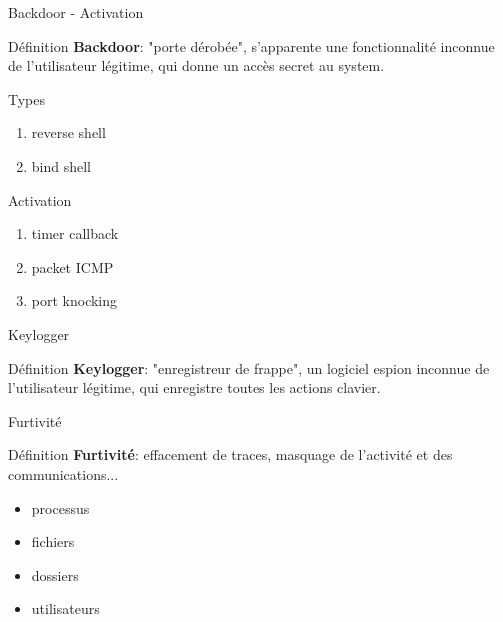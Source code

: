 \documentclass[10pt]{beamer}
\begin{document}
\begin{frame}{Backdoor - Activation}
	
	\begin{alertblock}{Définition}
		\textbf{Backdoor}: "porte dérobée", s'apparente une fonctionnalité inconnue de l'utilisateur légitime, qui donne un accès secret au system.
    \end{alertblock}
    
	\begin{alertblock}{Types}
		\begin{enumerate}
			\item reverse shell
			\item bind shell
		\end{enumerate}
    \end{alertblock}
    
	\begin{alertblock}{Activation}
		\begin{enumerate}
			\item timer callback
			\item packet ICMP
			\item port knocking
		\end{enumerate}
    \end{alertblock}


\end{frame}

\begin{frame}{Keylogger}
	
	\begin{alertblock}{Définition}
		\textbf{Keylogger}: "enregistreur de frappe", un logiciel espion inconnue de l'utilisateur légitime, qui enregistre toutes les actions clavier.
    \end{alertblock}

\end{frame}

\begin{frame}{Furtivité}
	
	\begin{alertblock}{Définition}
		\textbf{Furtivité}:  effacement de traces, masquage de l'activité et des communications...
    \end{alertblock}
	\begin{itemize}
		\item processus
		\item fichiers
		\item dossiers
		\item utilisateurs
	\end{itemize}	 

\end{frame}
\end{document}

